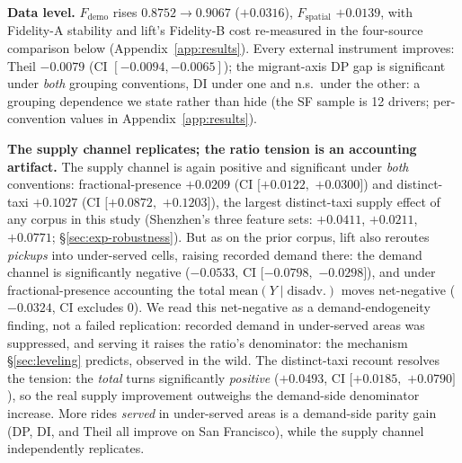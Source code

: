 \textbf{Data level.} $F_{\mathrm{demo}}$ rises $0.8752{\to}0.9067$
($+0.0316$), $F_{\mathrm{spatial}}$ $+0.0139$, with Fidelity-A stability and %
lift's Fidelity-B cost re-measured in the four-source comparison below
(Appendix~\ref{app:results}). Every external instrument improves: Theil $-0.0079$
(CI $[-0.0094, -0.0065]$); the migrant-axis DP gap is significant under
\emph{both} grouping conventions, DI under one and n.s.\ under the other:
a grouping dependence we state rather than hide (the SF sample is 12
drivers; per-convention values in Appendix~\ref{app:results}).

\textbf{The supply channel replicates; the ratio tension is an accounting
artifact.} The supply channel is again positive
and
significant under \emph{both} conventions: frac\-tional-pres\-ence
$+0.0209$ (CI $[+0.0122,$ $+0.0300]$) and dis\-tinct-taxi $+0.1027$
(CI $[+0.0872,$ $+0.1203]$), the largest distinct-taxi supply effect of
any corpus in this study (Shenzhen's three feature sets: $+0.0411$,
$+0.0211$, $+0.0771$; \S\ref{sec:exp-robustness}). But as on the prior
corpus, lift also reroutes \emph{pickups} into under-served cells, raising
recorded demand there: the demand channel is significantly negative
($-0.0533$, CI $[-0.0798,$ $-0.0298]$), and under frac\-tional-pres\-ence
accounting the
total $\mathrm{mean}(Y \mid \mathrm{disadv.})$ moves net-negative
($-0.0324$, CI excludes 0). We read this net-negative as a
demand-endogeneity finding, not a failed replication: recorded demand in
under-served areas was suppressed, and serving it raises the ratio's
denominator: the mechanism \S\ref{sec:leveling} predicts, observed in
the wild. The distinct-taxi recount resolves the tension: the \emph{total}
turns
significantly \emph{positive} ($+0.0493$, CI $[+0.0185,$ $+0.0790]$),
so the real supply improvement outweighs the demand-side denominator
increase. More rides \emph{served} in under-served areas is a demand-side
parity gain (DP, DI, and Theil all improve on San Francisco), while the
supply channel independently replicates.

